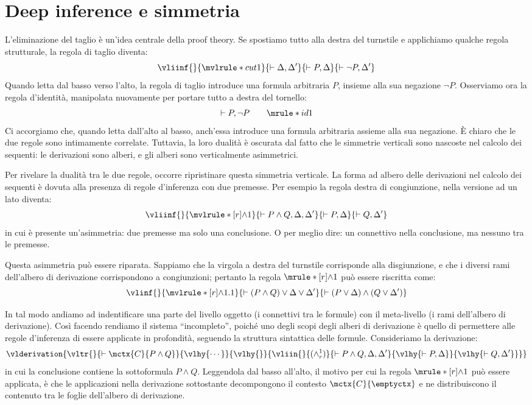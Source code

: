\documentclass[12pt,a4paper,openright,twoside]{report}
\begin{document}
\section{Deep inference e simmetria} 
L'eliminazione del taglio \`e un'idea centrale della proof theory. Se spostiamo tutto alla destra del turnstile e applichiamo qualche regola strutturale, la regola di taglio diventa:
$$
	\vliinf{}{\mvlrule*{cut}{1}}
		{\vdash \Delta, \Delta'}
		{\vdash P, \Delta}
		{\vdash \neg P, \Delta'}
$$
Quando letta dal basso verso l'alto, la regola di taglio introduce una formula arbitraria $P$, insieme alla sua negazione $\neg P$. Osserviamo ora la regola d'identit\`a, manipolata nuovamente per portare tutto a destra del tornello:
$$
	\vdash P, \neg P \qquad \mrule*{id}{1}
$$
Ci accorgiamo che, quando letta dall'alto al basso, anch'essa introduce una formula arbitraria assieme alla sua negazione. \`E chiaro che le due regole sono intimamente correlate. Tuttavia, la loro dualit\`a \`e oscurata dal fatto che le simmetrie verticali sono nascoste nel calcolo dei sequenti: le derivazioni sono alberi, e gli alberi sono verticalmente asimmetrici.

Per rivelare la dualit\`a tra le due regole, occorre ripristinare questa simmetria verticale. La forma ad albero delle derivazioni nel calcolo dei sequenti \`e dovuta alla presenza di regole d'inferenza con due premesse. Per esempio la regola destra di congiunzione, nella versione ad un lato diventa:
$$
	\vliinf{}{\mvlrule*[r]{\wedge}{1}}
		{\vdash P \wedge Q, \Delta, \Delta'}
		{\vdash P, \Delta}
		{\vdash Q, \Delta'}
$$
in cui \`e presente un'asimmetria: due premesse ma solo una conclusione. O per meglio dire: un connettivo nella conclusione, ma nessuno tra le premesse.

Questa asimmetria pu\`o essere riparata. Sappiamo che la virgola a destra del turnstile corrisponde alla disgiunzione, e che i diversi rami dell'albero di derivazione corrispondono a congiunzioni; pertanto la regola $\mrule*[r]{\wedge}{1}$ pu\`o essere riscritta come:
$$
	\vlinf{}{\mvlrule*[r]{\wedge}{1.1}}
		{\vdash (P \wedge Q) \vee \Delta \vee \Delta'}
		{\vdash (P \vee \Delta) \wedge (Q \vee \Delta')}
$$

In tal modo andiamo ad indentificare una parte del livello oggetto (i connettivi tra le formule) con il meta-livello (i rami dell'albero di derivazione). Cos\`i facendo rendiamo il sistema ``incompleto'', poich\'e uno degli scopi degli alberi di derivazione \`e quello di permettere alle regole d'inferenza di essere applicate in profondit\`a, seguendo la struttura sintattica delle formule. Consideriamo la derivazione:
$$
	\vlderivation{
		\vltr{}
			{\vdash \mctx{C}{P \wedge Q}}
			{\vlhy{\cdots}}
			{\vlhy{}}
			{
				\vliin{}{(\wedge_r^1)}
					{\vdash P \wedge Q, \Delta, \Delta'}
					{\vlhy{\vdash P, \Delta}}
					{\vlhy{\vdash Q, \Delta'}}
			}
	}
$$
in cui la conclusione contiene la sottoformula $P \wedge Q$. Leggendola dal basso all'alto, il motivo per cui la regola $\mrule*[r]{\wedge}{1}$ pu\`o essere applicata, \`e che le applicazioni nella derivazione sottostante decompongono il contesto $\mctx{C}{\emptyctx}$ e ne distribuiscono il contenuto tra le foglie dell'albero di derivazione.
\end{document}
